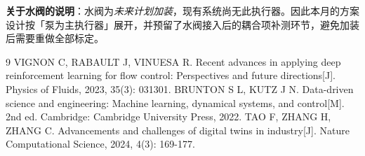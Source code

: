 \documentclass[stage2]{ydzjreport}
\begin{document}
\begin{notebox}
\textbf{关于水阀的说明}：水阀为\emph{未来计划加装}，现有系统尚无此执行器。因此本月的方案设计按「泵为主执行器」展开，并预留了水阀接入后的耦合项补测环节，避免加装后需要重做全部标定。
\end{notebox}

\begin{thebibliography}{9}
 VIGNON C, RABAULT J, VINUESA R. Recent advances in applying deep reinforcement learning for flow control: Perspectives and future directions[J]. Physics of Fluids, 2023, 35(3): 031301.
 BRUNTON S L, KUTZ J N. Data-driven science and engineering: Machine learning, dynamical systems, and control[M]. 2nd ed. Cambridge: Cambridge University Press, 2022.
 TAO F, ZHANG H, ZHANG C. Advancements and challenges of digital twins in industry[J]. Nature Computational Science, 2024, 4(3): 169-177.
\end{thebibliography}
\end{document}
